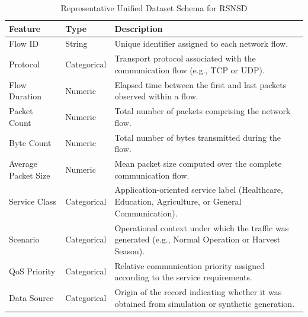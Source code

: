\documentclass[12pt,a4paper]{report}
\begin{document}
	\begin{table}[H]
		\centering
		\caption{Representative Unified Dataset Schema for RSNSD}
		\label{tab:schema}
		
		\begin{tabular}{|p{4cm}|p{2.5cm}|p{8cm}|}
			\hline
			
			\textbf{Feature} &
			\textbf{Type} &
			\textbf{Description}
			\\
			\hline
			
			Flow ID &
			String &
			Unique identifier assigned to each network flow.
			\\
			\hline
			
			Protocol &
			Categorical &
			Transport protocol associated with the communication flow (e.g., TCP or UDP).
			\\
			\hline
			
			Flow Duration &
			Numeric &
			Elapsed time between the first and last packets observed within a flow.
			\\
			\hline
			
			Packet Count &
			Numeric &
			Total number of packets comprising the network flow.
			\\
			\hline
			
			Byte Count &
			Numeric &
			Total number of bytes transmitted during the flow.
			\\
			\hline
			
			Average Packet Size &
			Numeric &
			Mean packet size computed over the complete communication flow.
			\\
			\hline
			
			Service Class &
			Categorical &
			Application-oriented service label (Healthcare, Education, Agriculture, or General Communication).
			\\
			\hline
			
			Scenario &
			Categorical &
			Operational context under which the traffic was generated (e.g., Normal Operation or Harvest Season).
			\\
			\hline
			
			QoS Priority &
			Categorical &
			Relative communication priority assigned according to the service requirements.
			\\
			\hline
			
			Data Source &
			Categorical &
			Origin of the record indicating whether it was obtained from simulation or synthetic generation.
			\\
			\hline
			
		\end{tabular}
		
	\end{table}
	
\end{document}
